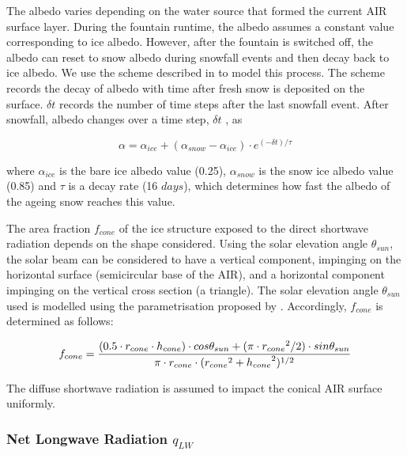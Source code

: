 \documentclass[utf8]{frontiersSCNS}
\begin{document}
The albedo varies depending on the water source that formed the current AIR surface layer. During the fountain
runtime, the albedo assumes a constant value corresponding to ice albedo. However, after the fountain is
switched off, the albedo can reset to snow albedo during snowfall events and then decay back to ice albedo. We
use the scheme described in \cite{OerlemansKnap_1998} to model this process. The scheme records the decay of
albedo with time after fresh snow is deposited on the surface. $\delta t$ records the number of time steps after
the last snowfall event. After snowfall, albedo changes over a time step, $\delta t$ , as

\begin{equation} \alpha=\alpha_{ice}+(\alpha_{snow}-\alpha_{ice}) \cdot e^{(-\delta t)/\tau} \label{eqn:a}
\end{equation}

where $\alpha_{ice}$ is the bare ice albedo value (0.25), $\alpha_{snow}$ is the snow ice albedo value (0.85)
and $\tau$ is a decay rate (16 $days$), which determines how fast the albedo of the ageing snow reaches this
value.

The area fraction $f_{cone}$ of the ice structure exposed to the direct shortwave radiation depends on the shape
considered. Using the solar elevation angle $\theta_{sun}$, the solar beam can be considered to have a vertical
component, impinging on the horizontal surface (semicircular base of the AIR), and a horizontal component
impinging on the vertical cross section (a triangle). The solar elevation angle $\theta_{sun}$ used is modelled
using the parametrisation proposed by \cite{Woolf_1968}. Accordingly, $f_{cone}$ is determined as follows:

\begin{equation}
	\begin{split}
		f_{cone}& =\frac{(0.5 \cdot r_{cone} \cdot h_{cone}) \cdot cos \theta_{sun} +(\pi \cdot
			{r_{cone}}^2/2) \cdot sin \theta_{sun} }{\pi \cdot r_{cone} \cdot ({r_{cone}}^2+{h_{cone}}^2)^{1/2}}\\
	\end{split}
	\label{eqn:f_{cone}}
\end{equation}

The diffuse shortwave radiation is assumed to impact the conical AIR surface uniformly.

\subsubsection{Net Longwave Radiation \texorpdfstring{$q_{LW}$}{Lg}}
\end{document}
